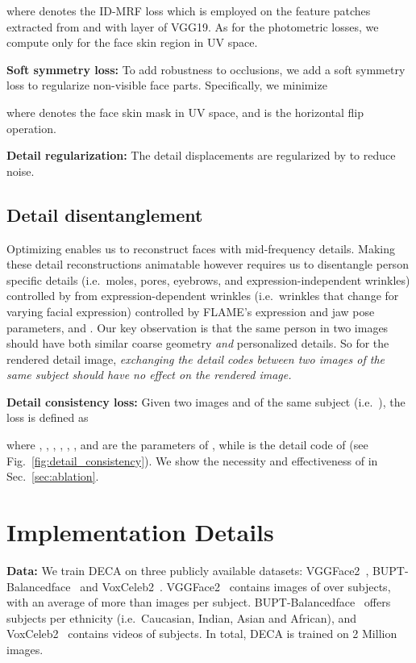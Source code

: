 \documentclass[final]{cvpr}
\newcommand{\qheading}[1]{\noindent\textbf{#1}}
\newcommand{\modelname}{DECA\xspace}
\begin{document}
where  denotes the ID-MRF loss which is employed on the feature patches extracted from  and  with layer  of VGG19.
As for the photometric losses, we compute  only for the face skin region in UV space.

\qheading{Soft symmetry loss:}
To add robustness to occlusions, we add a soft symmetry loss to regularize non-visible face parts.
Specifically, we minimize

where  denotes the face skin mask in UV space, and  is the horizontal flip operation. 

\qheading{Detail regularization:} 
The detail displacements are regularized by  to reduce noise.



\subsection{Detail disentanglement} 
\label{sec: disentanglement}
Optimizing  enables us to reconstruct faces with mid-frequency details.
Making these detail reconstructions animatable however requires us to disentangle person specific details (i.e.~moles, pores, eyebrows, and expression-independent wrinkles) controlled by  from expression-dependent wrinkles (i.e.~wrinkles that change for varying facial expression) controlled by FLAME's expression and jaw pose parameters,  and .
Our key observation is that the same person in two images should have both similar coarse geometry {\em and} personalized details. 
So for the rendered detail image, {\em exchanging the detail codes between two images of the same subject should have no effect on the rendered image.}

\qheading{Detail consistency loss:}
Given two images  and  of the same subject (i.e.~), the loss is defined as

where , , , , , , and  are the parameters of , while  is the detail code of  (see Fig.~\ref{fig:detail_consistency}).
We show the necessity and effectiveness of  in Sec.~\ref{sec:ablation}.





 \section{Implementation Details}


\qheading{Data:}
We train \modelname on three publicly available datasets: \mbox{VGGFace2}~\cite{Cao2018_VGGFace2}, BUPT-Balancedface~\cite{Wang_2019_ICCV} and VoxCeleb2~\cite{Chung18b}.
VGGFace2~\cite{Cao2018_VGGFace2} contains images of over  subjects, with an average of more than  images per subject. 
BUPT-Balancedface~\cite{Wang_2019_ICCV} offers  subjects per ethnicity (i.e.~Caucasian, Indian, Asian and African), and VoxCeleb2~\cite{Chung18b} contains  videos of  subjects.
In total, \modelname is trained on 2 Million images. 
\end{document}

